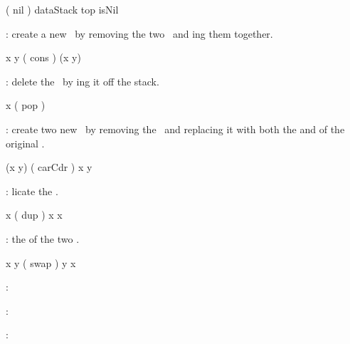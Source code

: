 \starttyping
{ }
( nil )
{ dataStack top isNil }
\stoptyping

\item {}: create a new  \lol\ by 
removing the  two \lols\ and ing them 
together. 

\starttyping
{ x y }
( cons )
{ (x y) }
\stoptyping

\stopitemize

\item {}

\startitemize[n]

\item {}: delete the  \lol\ by 
ing it off the stack. 

\starttyping
{ x }
( pop )
{ }
\stoptyping

\item {}: create two new  
\lols\ by removing the  \lol\ and replacing it with both the 
 and  of the original \lol. 

\starttyping
{ (x y) }
( carCdr )
{ x y }
\stoptyping

\stopitemize

\item {}

\startitemize[n]

\item {}: licate the 
 \lol. 

\starttyping
{ x }
( dup )
{ x x }
\stoptyping

\item {}:  the 
 of the  two \lols. 

\starttyping
{ x y }
( swap )
{ y x }
\stoptyping

\stopitemize

\item {}

\startitemize[n]

\item {}:

\item {}:

\item {}: 

